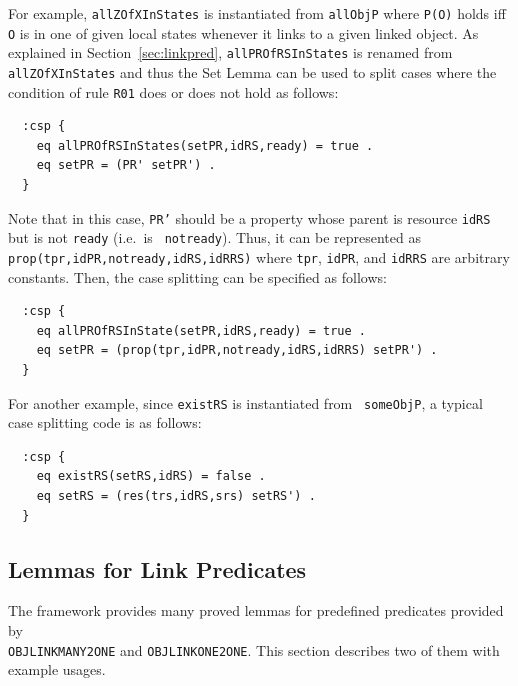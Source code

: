 \documentclass[12pt]{report}
\newcommand{\stt}[1]{{\small{\tt {#1}}}}
\begin{document}
For example, {\tt allZOfXInStates} is instantiated from {\tt allObjP}
where \stt{P(O)} holds iff {\tt O} is in one of given local
states whenever it links to a given linked object.  As explained in
Section~\ref{sec:linkpred}, {\tt allPROfRSInStates} is renamed
from {\tt allZOfXInStates} and thus the Set Lemma can be used to
split cases where the condition of rule {\tt R01} does or does not
hold as follows:
\small
\begin{verbatim}
  :csp {
    eq allPROfRSInStates(setPR,idRS,ready) = true .
    eq setPR = (PR' setPR') .
  }
\end{verbatim}
\normalsize
Note that in this case, {\tt PR'} should be a property whose parent is
resource {\tt idRS} but is not {\tt ready} (i.e.\ is {\tt
  notready}). Thus, it can be represented as
\stt{prop(tpr,idPR,notready,idRS,idRRS)} where {\tt tpr}, {\tt idPR},
and {\tt idRRS} are arbitrary constants. Then, the case splitting
can be specified as follows:
\small
\begin{verbatim}
  :csp {
    eq allPROfRSInState(setPR,idRS,ready) = true .
    eq setPR = (prop(tpr,idPR,notready,idRS,idRRS) setPR') .
  }
\end{verbatim}
\normalsize

For another example, since {\tt existRS} is instantiated from {\tt
  someObjP}, a typical case splitting code is as follows:
\small
\begin{verbatim}
  :csp {
    eq existRS(setRS,idRS) = false .
    eq setRS = (res(trs,idRS,srs) setRS') .
  }
\end{verbatim}
\normalsize

\subsection{Lemmas for Link Predicates}
\label{sec:linklemma}
The framework provides many proved lemmas for predefined predicates
provided by\\ {\tt OBJLINKMANY2ONE} and {\tt OBJLINKONE2ONE}. This
section describes two of them with example usages.
\end{document}
